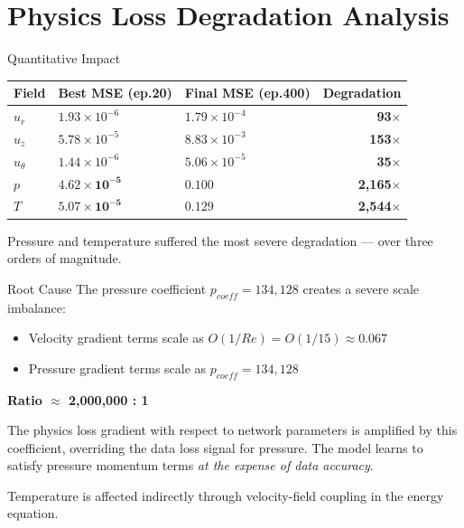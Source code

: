 \documentclass[aspectratio=169]{beamer}
\begin{document}
\section{Physics Loss Degradation Analysis}

\begin{frame}{Quantitative Impact}
\begin{table}
\centering
\begin{tabular}{lllr}
\toprule
Field & Best MSE (ep.20) & Final MSE (ep.400) & Degradation \\
\midrule
$u_r$ & $1.93\times10^{-6}$ & $1.79\times10^{-4}$ & \textbf{93$\times$} \\
$u_z$ & $5.78\times10^{-5}$ & $8.83\times10^{-3}$ & \textbf{153$\times$} \\
$u_\theta$ & $1.44\times10^{-6}$ & $5.06\times10^{-5}$ & \textbf{35$\times$} \\
\textbf{$p$} & $\mathbf{4.62\times10^{-5}}$ & $\mathbf{0.100}$ & \textbf{2,165$\times$} \\
\textbf{$T$} & $\mathbf{5.07\times10^{-5}}$ & $\mathbf{0.129}$ & \textbf{2,544$\times$} \\
\bottomrule
\end{tabular}
\end{table}

Pressure and temperature suffered the most severe degradation --- over three orders of magnitude.
\end{frame}

\begin{frame}{Root Cause}
The pressure coefficient $p_{coeff} = 134{,}128$ creates a severe scale imbalance:

\begin{itemize}
  \item Velocity gradient terms scale as $O(1/Re) = O(1/15) \approx 0.067$
  \item Pressure gradient terms scale as $p_{coeff} = 134{,}128$
\end{itemize}

\vspace{0.3cm}
\textbf{Ratio $\approx$ 2,000,000 : 1}

\vspace{0.3cm}
The physics loss gradient with respect to network parameters is amplified by this coefficient, overriding the data loss signal for pressure. The model learns to satisfy pressure momentum terms \textit{at the expense of data accuracy}.

\vspace{0.3cm}
Temperature is affected indirectly through velocity-field coupling in the energy equation.
\end{frame}
\end{document}
